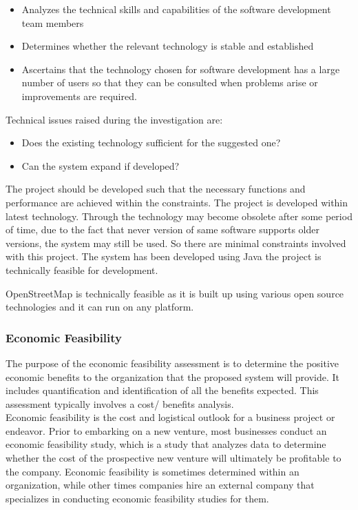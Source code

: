 \begin{itemize}
	\item Analyzes the technical skills and capabilities of the software development team members
	\item Determines whether the relevant technology is stable and established
	\item Ascertains that the technology chosen for software development has a large number of users so that they can be consulted when problems arise or improvements are required.
\end{itemize}

Technical issues raised during the investigation are:
\begin{itemize}
	\item Does the existing technology sufficient for the suggested one?
	\item Can the system expand if developed?
\end{itemize}

The project should be developed such that the necessary functions and performance are achieved within the constraints. The project is developed within latest technology. Through the technology may become obsolete after some period of time, due to the fact that never version of same software supports older versions, the system may still be used. So there are minimal constraints involved with this project. The system has been developed using Java the project is technically feasible for development.

OpenStreetMap is technically feasible as it is built up using various open source technologies and it can run on any platform.

\subsubsection{Economic Feasibility}
The purpose of the economic feasibility assessment is to determine the positive economic benefits to the organization that the proposed system will provide. It includes quantification and identification of all the benefits expected. This assessment typically involves a cost/ benefits analysis.\\

Economic feasibility is the cost and logistical outlook for a business project or endeavor. Prior to embarking on a new venture, most businesses conduct an economic feasibility study, which is a study that analyzes data to determine whether the cost of the prospective new venture will ultimately be profitable to the company. Economic feasibility is sometimes determined within an organization, while other times companies hire an external company that specializes in conducting economic feasibility studies for them.\\

